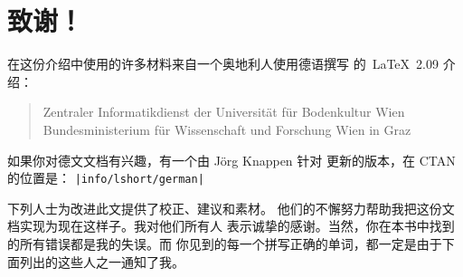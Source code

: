 
\chapter{致谢！}
\noindent 在这份介绍中使用的许多材料来自一个奥地利人使用德语撰写
的~\LaTeX\ 2.09 介绍：
\begin{verse}
%
{Zentraler Informatikdienst der Universit\"at f\"ur Bodenkultur Wien}
%
   {Bundesministerium f\"ur Wissenschaft und Forschung Wien}
%
   {in Graz}
\end{verse}

如果你对德文文档有兴趣，有一个由 J\"org Knappen 针对 \LaTeXe{} 更新的版本，在 CTAN 的位置是：
\texttt{\CTAN|info/lshort/german|}

\newpage
\noindent 下列人士为改进此文提供了校正、建议和素材。
他们的不懈努力帮助我把这份文档实现为现在这样子。我对他们所有人
表示诚挚的感谢。当然，你在本书中找到的所有错误都是我的失误。而
你见到的每一个拼写正确的单词，都一定是由于下面列出的这些人之一通知了我。

